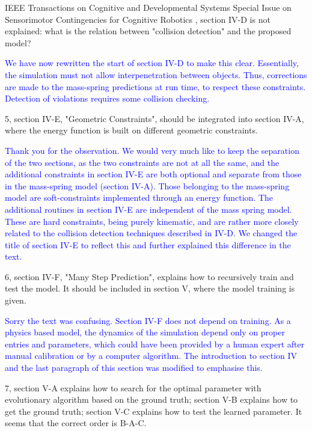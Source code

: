 \documentclass[a4paper,12pt]{letter}
\newcommand{\comment}[1]{\textcolor{blue}{#1}}
\begin{document}
\begin{letter}{IEEE Transactions on Cognitive and Developmental Systems\newline
Special Issue on Sensorimotor Contingencies for Cognitive Robotics}
, section IV-D is not explained: what is the relation between "collision detection" and the proposed model? 

\comment{We have now rewritten the start of section IV-D to make this clear. Essentially, the simulation must not allow interpenetration between objects. Thus, corrections are made to the mass-spring predictions at run time, to respect these constraints. Detection of violations requires some collision checking.}

5, section IV-E, "Geometric Constraints", should be integrated into section IV-A, where the energy function is built on different geometric constraints.



\comment{Thank you for the observation. We would very much like to keep the separation of the two sections, as the two constraints are not at all the same, and the additional constraints in section IV-E are both optional and separate from those in the mass-spring model (section IV-A). Those belonging to the mass-spring model are soft-constraints implemented through an energy function. The additional routines in section IV-E are independent of the mass spring model.  These are hard constraints, being purely kinematic, and are rather more closely related to the collision detection techniques described in IV-D.  We changed the title of section IV-E to reflect this and further explained this difference in the text.}

6, section IV-F, "Many Step Prediction", explains how to recursively train and test the model. It should be included in section V, where the model training is given.

\comment{Sorry the text was confusing.  Section IV-F does not depend on training.  As a physics based model, the dynamics of the simulation depend only on proper entries and parameters, which could have been provided by a human expert after manual calibration or by a computer algorithm.  The introduction to section IV and the last paragraph of this section was modified to emphasise this.}

7, section V-A explains how to search for the optimal parameter with evolutionary algorithm based on the ground truth; section V-B explains how to get the ground truth; section V-C explains how to test the learned parameter. It seems that the correct order is B-A-C.


\end{letter}
\end{document}
